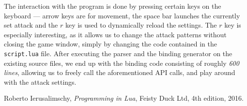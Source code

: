 \documentclass[polish, english]{iithesis}
\begin{document}
  The interaction with the program is done by pressing certain keys on the keyboard --- arrow keys are for movement, the space bar launches the currently set attack and the $r$ key is used to dynamically reload the settings.
  The $r$ key is especially interesting, as it allows us to change the attack patterns without closing the game window, simply by changing the code contained in the \texttt{script.lua} file.
  After executing the parser and the binding generator on the existing source files, we end up with the binding code consisting of roughly \textit{600 lines}, allowing us to freely call the aforementioned API calls, and play around with the attack settings.

\begin{thebibliography}{42}
    Roberto Ierusalimschy,
    \emph{Programming in Lua},
    Feisty Duck Ltd,
    4th edition,
    2016.
\end{thebibliography}
\end{document}
